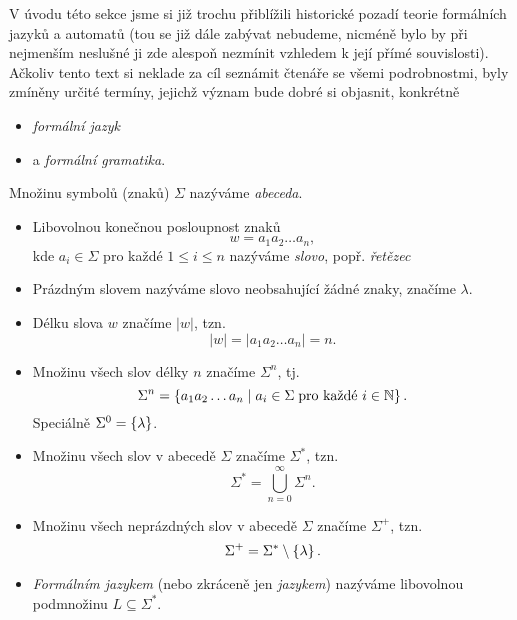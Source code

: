 V úvodu této sekce jsme si již trochu přiblížili historické pozadí teorie formálních jazyků a automatů (tou se již dále zabývat nebudeme, nicméně bylo by při nejmenším neslušné ji zde alespoň nezmínit vzhledem k její přímé souvislosti). Ačkoliv tento text si neklade za cíl seznámit čtenáře se všemi podrobnostmi, byly zmíněny určité termíny, jejichž význam bude dobré si objasnit, konkrétně
\begin{itemize}
    \item \emph{formální jazyk}
    \item a \emph{formální gramatika}.
\end{itemize}
\begin{definition}\label{def:formalni-jazyk-etc}
    Množinu symbolů (znaků) $\Sigma$ nazýváme \emph{abeceda}.
    \begin{itemize}
        \item Libovolnou konečnou posloupnost znaků
        \[w=a_1a_2\ldots a_n,\]
        kde $a_i\in\Sigma$ pro každé $1\leqslant i\leqslant n$ nazýváme \emph{slovo}, popř. \emph{řetězec}
        \item Prázdným slovem nazýváme slovo neobsahující žádné znaky, značíme $\lambda$.
        \item Délku slova $w$ značíme $|w|$, tzn.
        \[|w|=|a_1a_2\ldots a_n|=n.\]
        \item Množinu všech slov délky $n$ značíme $\Sigma^n$, tj.
        \[\Sigma^n=\left\{a_1a_2\ldots a_n\mid a_i\in\Sigma\;\text{pro každé $i\in\mathbb{N}$}\right\}.\]
        Speciálně $\Sigma^0=\left\{\lambda\right\}$.
        \item Množinu všech slov v abecedě $\Sigma$ značíme $\Sigma^*$, tzn.
        \[\Sigma^*=\bigcup_{n=0}^\infty\Sigma^n.\]
        \item Množinu všech neprázdných slov v abecedě $\Sigma$ značíme $\Sigma^+$, tzn.
        \[\Sigma^+=\Sigma^*\setminus\left\{\lambda\right\}.\]
        \item \emph{Formálním jazykem} (nebo zkráceně jen \emph{jazykem}) nazýváme libovolnou podmnožinu $L\subseteq\Sigma^*$.
    \end{itemize}
\end{definition}
